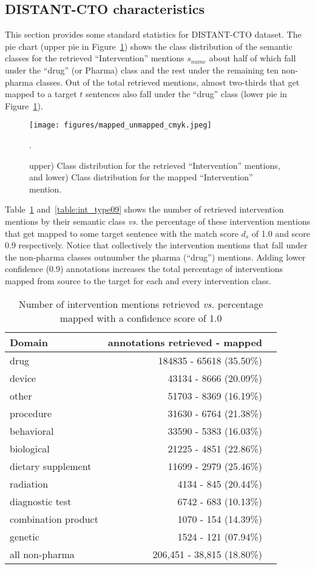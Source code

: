 \documentclass[letterpaper]{article} %
\begin{document}
\subsection{DISTANT-CTO characteristics}
\label{app:char}
%
This section provides some standard statistics for DISTANT-CTO dataset.
The pie chart (upper pie in Figure~\ref{app:classdist}) shows the class distribution of the semantic classes for the retrieved ``Intervention'' mentions $s_{name}$ about half of which fall under the ``drug'' (or Pharma) class and the rest under the remaining ten non-pharma classes.
Out of the total retrieved mentions, almost two-thirds that get mapped to a target $t$ sentences also fall under the ``drug'' class (lower pie in Figure~\ref{app:classdist}).
%
\begin{figure}[ht]
\centering
\texttt{[image: figures/mapped\_unmapped\_cmyk.jpeg]}
\caption{upper) Class distribution for the retrieved ``Intervention'' mentions, and lower) Class distribution for the mapped ``Intervention'' mention.}.
\label{app:classdist}
\end{figure}
%
%
%
Table~\ref{table:int_type10} and~\ref{table:int_type09} shows the number of retrieved intervention mentions by their semantic class \textit{vs.} the percentage of these intervention mentions that get mapped to some target sentence with the match score $d_s$ of 1.0 and score 0.9 respectively.
Notice that collectively the intervention mentions that fall under the non-pharma classes outnumber the pharma (``drug'') mentions.
Adding lower confidence (0.9) annotations increases the total percentage of interventions mapped from source to the target for each and every intervention class.
%
\begin{table}[!htbp]
\centering
\begin{tabular}{lrl}
\hline \textbf{Domain} & \textbf{ annotations retrieved - mapped } \\ \hline
drug & 184835 - 65618 (35.50\%) \\
device & 43134 - 8666 (20.09\%) \\
other & 51703 - 8369 (16.19\%) \\
procedure & 31630 - 6764 (21.38\%) \\
behavioral & 33590 - 5383 (16.03\%) \\
biological & 21225 - 4851 (22.86\%) \\
dietary supplement & 11699 - 2979 (25.46\%) \\
radiation & 4134 - 845 (20.44\%) \\
diagnostic test & 6742 - 683 (10.13\%) \\
combination product & 1070 - 154 (14.39\%) \\
genetic & 1524 - 121 (07.94\%) \\
all non-pharma & 206,451 - 38,815 (18.80\%)\\
\hline
\end{tabular}
\caption{Number of intervention mentions retrieved \textit{vs.} percentage mapped with a confidence score of 1.0}
\label{table:int_type10} 
\end{table}
\end{document}
